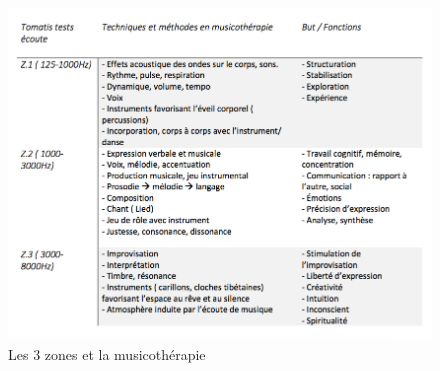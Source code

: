 





  \begin{figure}[tbh]
  	\centering
  	\includegraphics[width=1.2\linewidth]{images/testtechnmethbut}
  	\caption[Zones du test avec la musicothérapie]{Les 3
            zones et la musicothérapie}

  	\label{testbutetfonction}
  \end{figure}











